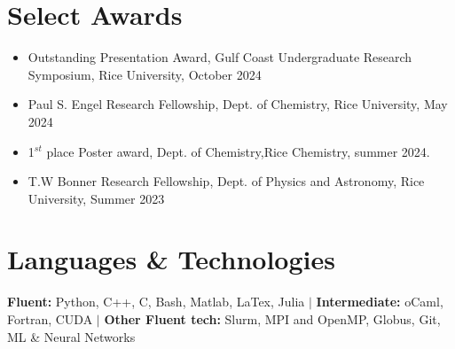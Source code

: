 \documentclass[letterpaper,11pt]{article}
\newcommand{\resumeItem}[1]{
  \item\small{
    {#1 \vspace{-2pt}}
  }
}
\newcommand{\resumeItemListStart}{\begin{itemize}}
\newcommand{\resumeItemListEnd}{\end{itemize}\vspace{-5pt}}
\begin{document}
\vspace{-4mm}
\section{Select Awards}
      \resumeItemListStart
      \vspace{-1mm}
        \resumeItem{Outstanding Presentation Award, Gulf Coast Undergraduate Research Symposium, Rice University, October 2024}
        \resumeItem{Paul S. Engel Research Fellowship, Dept. of Chemistry, Rice University, May 2024}
        \resumeItem{1$^{st}$ place Poster award, Dept. of Chemistry,Rice Chemistry, summer 2024.}
        \resumeItem{T.W Bonner Research Fellowship, Dept. of Physics and Astronomy, Rice University, Summer 2023}
      \resumeItemListEnd

\vspace{-4mm}
\section{Languages \& Technologies}
 \begin{itemize}[leftmargin=0.15in, label={}]
    \small{\item{
    \vspace{-1mm}
     \textbf{Fluent:} Python, C++, C, Bash, Matlab, LaTex, Julia} $|$ \textbf{Intermediate:} oCaml, Fortran, CUDA $|$ \textbf{Other Fluent tech:} Slurm, MPI and OpenMP, Globus, Git, ML \& Neural Networks\\
     \vspace{1mm}

    }
 \end{itemize}
\end{document}
